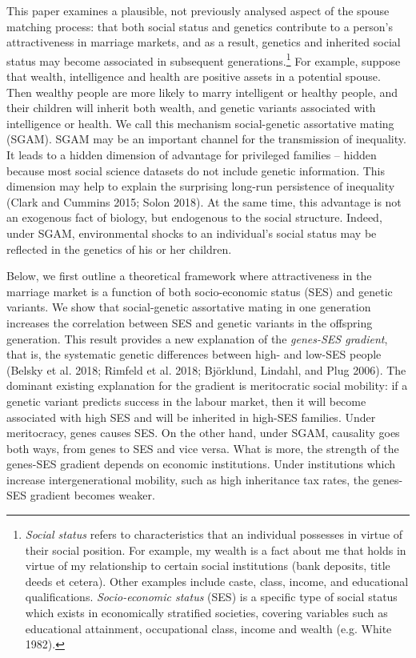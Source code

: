 \documentclass[
]{article}
\theoremstyle{definition}
\theoremstyle{definition}
\theoremstyle{definition}
\theoremstyle{definition}
\theoremstyle{remark}
\begin{document}
This paper examines a plausible, not previously analysed aspect of the spouse
matching process: that both social status and genetics contribute to a person's
attractiveness in marriage markets, and as a result, genetics and inherited
social status may become associated in subsequent generations.\footnote{\emph{Social status} refers to characteristics that an individual
  possesses in virtue of their social position. For example, my wealth
  is a fact about me that holds in virtue of my relationship to
  certain social institutions (bank deposits, title deeds et cetera).
  Other examples include caste, class, income, and educational
  qualifications. \emph{Socio-economic status} (SES) is a specific type of
  social status which exists in economically stratified societies, covering
  variables such as educational attainment, occupational class, income and
  wealth (e.g. White 1982).} For
example, suppose that wealth, intelligence and health are positive assets in a
potential spouse. Then wealthy people are more likely to marry intelligent or
healthy people, and their children will inherit both wealth, and genetic
variants associated with intelligence or health. We call this mechanism
social-genetic assortative mating (SGAM). SGAM may be an important channel for
the transmission of inequality. It leads to a hidden dimension of advantage for
privileged families -- hidden because most social science datasets do not include
genetic information. This dimension may help to explain the surprising long-run
persistence of inequality (Clark and Cummins 2015; Solon 2018). At the
same time, this advantage is not an exogenous fact of biology, but endogenous to
the social structure. Indeed, under SGAM, environmental shocks to an
individual's social status may be reflected in the genetics of his or her
children.

Below, we first outline a theoretical framework where attractiveness in the
marriage market is a function of both socio-economic status (SES) and genetic
variants. We show that social-genetic assortative mating in one generation
increases the correlation between SES and genetic variants in the offspring
generation. This result provides a new explanation of the \emph{genes-SES gradient},
that is, the systematic genetic differences between high- and low-SES people
(Belsky et al. 2018; Rimfeld et al. 2018; Björklund, Lindahl, and Plug 2006). The
dominant existing explanation for the gradient is meritocratic social mobility:
if a genetic variant predicts success in the labour market, then it will
become associated with high SES and will be inherited in high-SES families.
Under meritocracy, genes causes SES. On the other hand, under SGAM,
causality goes both ways, from genes to SES and vice versa. What is more, the
strength of the genes-SES gradient depends on economic institutions. Under
institutions which increase intergenerational mobility, such as high inheritance
tax rates, the genes-SES gradient becomes weaker.
\end{document}
